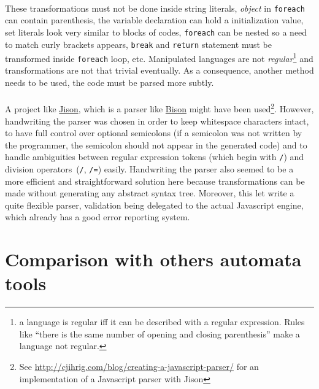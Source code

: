 \documentclass{article}
\begin{document}
\begin{sloppypar}
      
\paragraph{}
These transformations must not be done inside string literals, {\itshape object} in \lstinline!foreach! can contain parenthesis, the variable declaration can hold a initialization value, set literals look very similar to blocks of codes, \lstinline!foreach! can be nested so a need to match curly brackets appears, \lstinline!break! and \lstinline!return! statement must be transformed inside \lstinline!foreach! loop, etc. Manipulated languages are not {\itshape regular}\footnote{a language is regular iff it can be described with a regular expression. Rules like “there is the same number of opening and closing parenthesis” make a language not regular.} and transformations are not that trivial eventually. As a consequence, another method needs to be used, the code must be parsed more subtly.

      
\paragraph{}
A project like \href{http://zaach.github.io/jison/}{Jison}, which is a parser like \href{http://www.gnu.org/software/bison/}{Bison} might have been used\footnote{See \href{http://cjihrig.com/blog/creating-a-javascript-parser/}{http://cjihrig.com/blog/creating-a-javascript-parser/} for an implementation of a Javascript parser with Jison}. However, handwriting the parser was chosen in order to keep whitespace characters intact, to have full control over optional semicolons (if a semicolon was not written by the programmer, the semicolon should not appear in the generated code) and to handle ambiguities between regular expression tokens (which begin with \lstinline!/!) and division operators (\lstinline!/!, \lstinline!/=!) easily. Handwriting the parser also seemed to be a more efficient and straightforward solution here because transformations can be made without generating any abstract syntax tree. Moreover, this let write a quite flexible parser, validation being delegated to the actual Javascript engine, which already has a good error reporting system.
   




\section{ Comparison with others automata tools}



\end{sloppypar}
\end{document}
